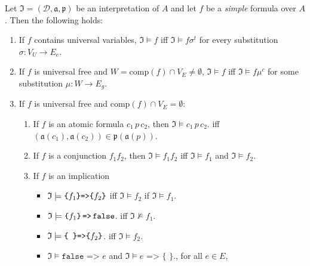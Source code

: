 \begin{definition}
Let $\mathfrak{I}=(\mathcal{D},\mathfrak{a,p})$ be an interpretation of $A$
and let  $f$ be a \emph{simple} formula over $A$. %
Then the following holds:
\begin{enumerate}
 \item\label{quant1} If $f$ contains universal variables, $\mathfrak{I}\models f$ iff $\mathfrak{I}\models f\sigma^t$ 
 for every substitution $\sigma: V_U\rightarrow E_e$. 
 \item \label{quant2} If $f$ is universal free and $W=\text{comp}(f)\cap V_E \neq \emptyset$, $\mathfrak{I}\models f$ 
 iff $\mathfrak{I}\models f\mu^c$ for some substitution $\mu: W\rightarrow E_g$.
  \item If $f$ is universal free and $\text{comp}(f)\cap V_E=\emptyset$:
  \begin{enumerate}
   \item If $f$ is an atomic formula $c_1\, p\, c_2$, then  $\mathfrak{I} \models c_1\, p\, c_2$. 
  iff $(\mathfrak{a}(c_1),\mathfrak{a}(c_2))\in\mathfrak{p}(\mathfrak{a}(p))$.
  \item If $f$ is a conjunction $f_1f_2$, then  $\mathfrak{I}\models f_1 f_2$ iff $\mathfrak{I}\models f_1$ and $\mathfrak{I}\models f_2$.\label{conj}
  \item If $f$ is an implication\label{implication} %
  \begin{itemize}
  \item $\mathfrak{I} \models \verb!{! f_1 \verb!}! \verb!=>! \verb!{! f_2 \verb!}!$ iff $\mathfrak{I} \models f_2$ if $\mathfrak{I} \models f_1$.
  \item \label{fal2} %
  $\mathfrak{I} \models \verb!{! f_1 \verb!}! \,\verb!=>!\, \verb!false!$. iff $\mathfrak{I} \not\models f_1$.
   \item $\mathfrak{I} \models \verb!{ }! \verb!=>! \verb!{! f_2 \verb!}!$. iff $\mathfrak{I} \models f_2$.
   \item $\mathfrak{I} \models \texttt{false => }e$ and $\mathfrak{I}\models e\texttt{ => \{~\}}.$, for all $e\in E$, 
   \end{itemize}
 \end{enumerate}
\end{enumerate}
  
\end{definition}

